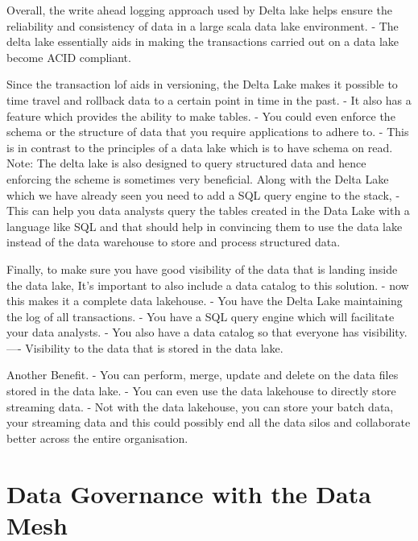 \documentclass[a4paper, 11pt]{article}
\begin{document}
    Overall, the write ahead logging approach used by Delta lake helps ensure the reliability and consistency of data in a large scala data lake environment.
    - The delta lake essentially aids in making the transactions carried out on a data lake become ACID compliant.

    Since the transaction lof aids in versioning, the Delta Lake makes it possible to time travel and rollback data to a certain point in time in the past.
    - It also has a feature which provides the ability to make tables.
    - You could even enforce the schema or the structure of data that you require applications to adhere to.
    - This is in contrast to the principles of a data lake which is to have schema on read.
    Note: The delta lake is also designed to query structured data and hence enforcing the scheme is sometimes very beneficial.
    Along with the Delta Lake which we have already seen you need to add a SQL query engine to the stack,
    - This can help you data analysts query the tables created in the Data Lake with a language like SQL and that should help in convincing them to use the data lake instead of the data warehouse to store and process structured data.

    Finally, to make sure you have good visibility of the data that is landing inside the data lake, It's important to also include a data catalog to this solution.
    - now this makes it a complete data lakehouse.
    - You have the Delta Lake maintaining the log of all transactions.
    - You have a SQL query engine which will facilitate your data analysts.
    - You also have a data catalog so that everyone has visibility.
    ---- Visibility to the data that is stored in the data lake.

    Another Benefit.
    - You can perform, merge, update and delete on the data files stored in the data lake.
    - You can even use the data lakehouse to directly store streaming data.
    - Not with the data lakehouse, you can store your batch data, your streaming data and this could possibly end all the data silos and collaborate better across the entire organisation.


    \section{Data Governance with the Data Mesh}
\end{document}
